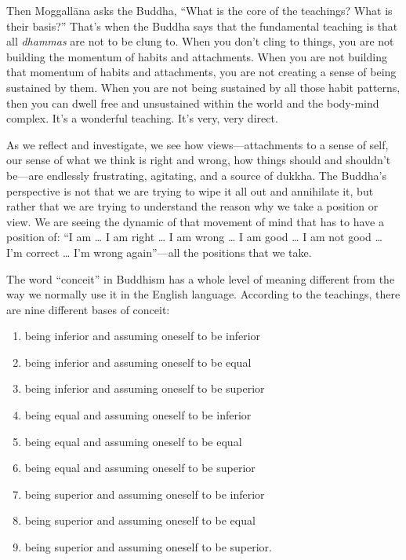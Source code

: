 Then Moggallāna asks the Buddha, “What is the core of the teachings?
What is their basis?” That’s when the Buddha says that the fundamental
teaching is that all \emph{dhammas} are not to be clung to. When you
don’t cling to things, you are not building the momentum of habits and
attachments. When you are not building that momentum of habits and
attachments, you are not creating a sense of being sustained by them.
When you are not being sustained by all those habit patterns, then you
can dwell free and unsustained within the world and the body-mind
complex. It’s a wonderful teaching. It’s very, very direct.

As we reflect and investigate, we see how views—attachments to a sense
of self, our sense of what we think is right and wrong, how things
should and shouldn’t be—are endlessly frustrating, agitating, and a
source of dukkha. The Buddha’s perspective is not that we are trying to
wipe it all out and annihilate it, but rather that we are trying to
understand the reason why we take a position or view. We are seeing the
dynamic of that movement of mind that has to have a position of: “I am
\ldots{} I am right \ldots{} I am wrong \ldots{} I am good \ldots{} I am not good \ldots{} I’m
correct \ldots{} I’m wrong again”—all the positions that we take.

The word “conceit” in Buddhism has a whole level of meaning different
from the way we normally use it in the English language. According to
the teachings, there are nine different bases of conceit:

\begin{enumerate}
\def\labelenumi{\arabic{enumi}.}
\item
  being inferior and assuming oneself to be inferior
\item
  being inferior and assuming oneself to be equal
\item
  being inferior and assuming oneself to be superior
\item
  being equal and assuming oneself to be inferior
\item
  being equal and assuming oneself to be equal
\item
  being equal and assuming oneself to be superior
\item
  being superior and assuming oneself to be inferior
\item
  being superior and assuming oneself to be equal
\item
  being superior and assuming oneself to be superior.
\end{enumerate}


